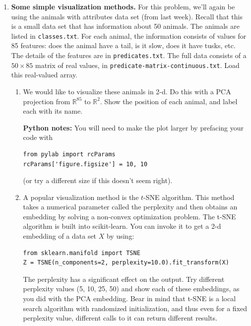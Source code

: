 \documentclass{article}
\begin{document}
\begin{enumerate}
\begin{enumerate}
    \item Suppose we used principal component analysis (PCA) to project points $X$ into two dimensions. Which directions would it project onto?
    \item Continuing from part (d), what would be the resulting two-dimensional projection of the point $x = \begin{bmatrix}4 \\ 0 \\ 2\end{bmatrix}$?
    \item Continuing from part (e), suppose that starting from the 2-d projection, we tried to reconstruct the original $x$. What would the three-dimensional reconstruction be, exactly?
    \end{enumerate}

\item \textbf{Some simple visualization methods.} For this problem, we'll again be using the animals with attributes data set (from last week). Recall that this is a small data set that has information about 50 animals. The animals are listed in \texttt{classes.txt}. For each animal, the information consists of values for 85 features: does the animal have a tail, is it slow, does it have tusks, etc. The details of the features are in \texttt{predicates.txt}. The full data consists of a $50 \times 85$ matrix of real values, in \texttt{predicate-matrix-continuous.txt}. Load this real-valued array.
    \begin{enumerate}
    \item We would like to visualize these animals in 2-d. Do this with a PCA projection from $\mathbb{R}^{85}$ to $\mathbb{R}^{2}$. Show the position of each animal, and label each with its name.

        \textbf{Python notes:} You will need to make the plot larger by prefacing your code with
        \begin{verbatim}
from pylab import rcParams
rcParams['figure.figsize'] = 10, 10
        \end{verbatim}
        (or try a different size if this doesn't seem right).

    \item A popular visualization method is the $t$-SNE algorithm. This method takes a numerical parameter called the perplexity and then obtains an embedding by solving a non-convex optimization problem. The t-SNE algorithm is built into scikit-learn. You can invoke it to get a 2-d embedding of a data set $X$ by using:
        \begin{verbatim}
from sklearn.manifold import TSNE
Z = TSNE(n_components=2, perplexity=10.0).fit_transform(X)
        \end{verbatim}
        The perplexity has a significant effect on the output. Try different perplexity values (5, 10, 25, 50) and show each of these embeddings, as you did with the PCA embedding. Bear in mind that t-SNE is a local search algorithm with randomized initialization, and thus even for a fixed perplexity value, different calls to it can return different results.


\end{enumerate}
\end{enumerate}
\end{document}
